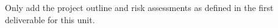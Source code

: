 \clearpage %
\printbibliography[title={References},heading=bibintoc] %

\begin{uomappendix} 
  Only add the project outline and risk assessments as defined in the first deliverable for this unit. 
\end{uomappendix}

